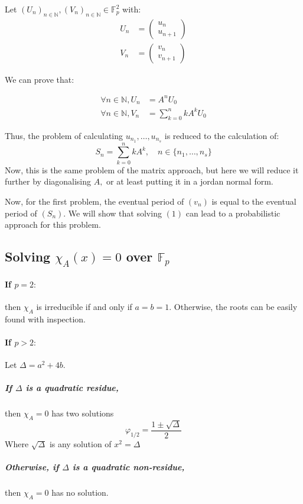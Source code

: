 \documentclass[]{article}
\begin{document}
Let $(U_n)_{n\in\mathbb{N}},(V_n)_{n\in\mathbb{N}}\in\mathbb{F}_p^2$ with:
\begin{align*}
	U_n&= \begin{pmatrix}
		u_n\\ u_{n+1}
	\end{pmatrix}\\
	V_n&= \begin{pmatrix}
		v_n\\ v_{n+1}
	\end{pmatrix}
\end{align*}

We can prove that:

\begin{align*}
	\forall n\in\mathbb{N}, U_n&=A^nU_0\\
	\forall n\in\mathbb{N}, V_n&=\sum_{k=0}^nkA^kU_0
\end{align*}

Thus, the problem of calculating $u_{n_1},\dots,u_{n_s}$ is reduced to the calculation of:
\begin{equation}\tag{1}
	\boxed{S_n=\sum_{k=0}^n kA^k,\quad n\in\{n_1,\dots,n_s\}} 
\end{equation}
Now, this is the same problem of the matrix approach, but here we will reduce it further by diagonalising $A,$ or at least putting it in a jordan normal form.


Now, for the first problem, the eventual period of $(v_n)$ is equal to the eventual period of $(S_n).$ We will show that solving $(1)$ can lead to a probabilistic approach for this problem.
\subsection{Solving $\chi_A(x) = 0$ over $\mathbb{F}_p$}
\paragraph{If $p=2: $} then $\chi_A$ is irreducible if and only if $a=b=1.$ Otherwise, the roots can be easily found with inspection.
\paragraph{If $p>2: $} Let $\Delta=a^2+4b$.
\subparagraph{If $\Delta$ is a quadratic residue,} then $\chi_A=0$ has two solutions $$\varphi_{1/2}=\frac{1\pm \sqrt{\Delta}}{2}$$Where $\sqrt{\Delta}$ is any solution of $x^2=\Delta$
\subparagraph{Otherwise, if $\Delta$ is a quadratic non-residue,} then $\chi_A = 0$ has no solution.
\end{document}
